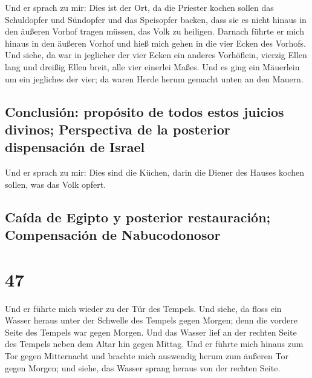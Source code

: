  Und er sprach zu mir: Dies ist der Ort, da die Priester
kochen sollen das Schuldopfer und Sündopfer und das Speisopfer backen,
dass sie es nicht hinaus in den äußeren Vorhof tragen müssen, das Volk
zu heiligen.  Darnach führte er mich hinaus in den
äußeren Vorhof und hieß mich gehen in die vier Ecken des Vorhofs.
 Und siehe, da war in jeglicher der vier Ecken ein
anderes Vorhöflein, vierzig Ellen lang und dreißig Ellen breit, alle
vier einerlei Maßes.  Und es ging ein Mäuerlein um ein
jegliches der vier; da waren Herde herum gemacht unten an den Mauern.

\hypertarget{conclusiuxf3n-propuxf3sito-de-todos-estos-juicios-divinos-perspectiva-de-la-posterior-dispensaciuxf3n-de-israel}{%
\subsection{Conclusión: propósito de todos estos juicios divinos;
Perspectiva de la posterior dispensación de
Israel}\label{conclusiuxf3n-propuxf3sito-de-todos-estos-juicios-divinos-perspectiva-de-la-posterior-dispensaciuxf3n-de-israel}}

 Und er sprach zu mir: Dies sind die Küchen, darin die
Diener des Hauses kochen sollen, was das Volk opfert.

\hypertarget{cauxedda-de-egipto-y-posterior-restauraciuxf3n-compensaciuxf3n-de-nabucodonosor}{%
\subsection{Caída de Egipto y posterior restauración; Compensación de
Nabucodonosor}\label{cauxedda-de-egipto-y-posterior-restauraciuxf3n-compensaciuxf3n-de-nabucodonosor}}

\hypertarget{section-46}{%
\section{47}\label{section-46}}

 Und er führte mich wieder zu der Tür des Tempels. Und
siehe, da floss ein Wasser heraus unter der Schwelle des Tempels gegen
Morgen; denn die vordere Seite des Tempels war gegen Morgen. Und das
Wasser lief an der rechten Seite des Tempels neben dem Altar hin gegen
Mittag.  Und er führte mich hinaus zum Tor gegen
Mitternacht und brachte mich auswendig herum zum äußeren Tor gegen
Morgen; und siehe, das Wasser sprang heraus von der rechten Seite.

